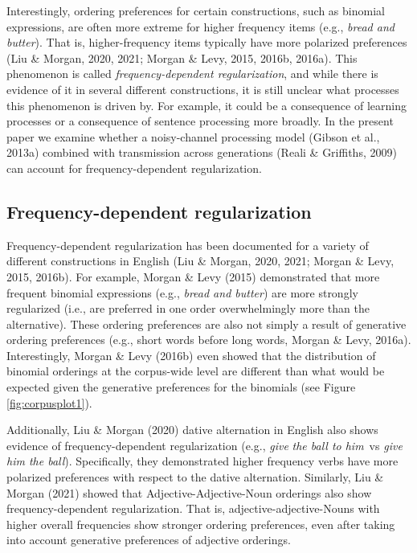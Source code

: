 \documentclass[10pt, letterpaper]{article}
\begin{document}
Interestingly, ordering preferences for certain constructions, such as
binomial expressions, are often more extreme for higher frequency items
(e.g., \emph{bread and butter}). That is, higher-frequency items
typically have more polarized preferences (Liu \& Morgan, 2020, 2021;
Morgan \& Levy, 2015, 2016b, 2016a). This phenomenon is called
\emph{frequency-dependent regularization}, and while there is evidence
of it in several different constructions, it is still unclear what
processes this phenomenon is driven by. For example, it could be a
consequence of learning processes or a consequence of sentence
processing more broadly. In the present paper we examine whether a
noisy-channel processing model (Gibson et al., 2013a) combined with
transmission across generations (Reali \& Griffiths, 2009) can account
for frequency-dependent regularization.

\hypertarget{frequency-dependent-regularization}{%
\subsection{Frequency-dependent
regularization}\label{frequency-dependent-regularization}}

Frequency-dependent regularization has been documented for a variety of
different constructions in English (Liu \& Morgan, 2020, 2021; Morgan \&
Levy, 2015, 2016b). For example, Morgan \& Levy (2015) demonstrated that
more frequent binomial expressions (e.g., \emph{bread and butter}) are
more strongly regularized (i.e., are preferred in one order
overwhelmingly more than the alternative). These ordering preferences
are also not simply a result of generative ordering preferences (e.g.,
short words before long words, Morgan \& Levy, 2016a). Interestingly,
Morgan \& Levy (2016b) even showed that the distribution of binomial
orderings at the corpus-wide level are different than what would be
expected given the generative preferences for the binomials (see Figure
\ref{fig:corpusplot1}).

Additionally, Liu \& Morgan (2020) dative alternation in English also
shows evidence of frequency-dependent regularization (e.g., \emph{give}
\emph{the ball to him}~vs \emph{give him the ball}). Specifically, they
demonstrated higher frequency verbs have more polarized preferences with
respect to the dative alternation. Similarly, Liu \& Morgan (2021)
showed that Adjective-Adjective-Noun orderings also show
frequency-dependent regularization. That is, adjective-adjective-Nouns
with higher overall frequencies show stronger ordering preferences, even
after taking into account generative preferences of adjective orderings.
\end{document}
